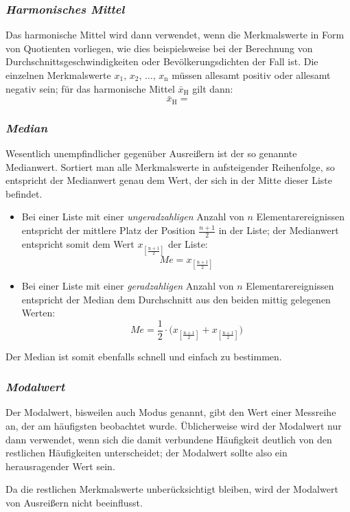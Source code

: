 \documentclass[a4paper]{article}
\providecommand*{\DUrubric}[2][class-arg]{%
  \subsubsection*{\centering\textit{\textmd{#2}}}}
\begin{document}
\DUrubric{Harmonisches Mittel}

Das harmonische Mittel wird dann verwendet, wenn die Merkmalswerte in Form von
Quotienten vorliegen, wie dies beispielsweise bei der Berechnung von
Durchschnittsgeschwindigkeiten oder Bevölkerungsdichten der Fall ist. Die
einzelnen Merkmalswerte $x_1,\,x_2,\,\ldots,\,x_{\mathrm{n}}$  müssen
allesamt positiv oder allesamt negativ sein; für das harmonische Mittel
$\bar{x}_{\mathrm{H}}$ gilt dann:
%
\begin{equation*}
\bar{x}_{\mathrm{H}} =
\end{equation*}
\DUrubric{Median}

Wesentlich unempfindlicher gegenüber Ausreißern ist der so genannte Medianwert.
Sortiert man alle Merkmalswerte in aufsteigender Reihenfolge, so entspricht der
Medianwert genau dem Wert, der sich in der Mitte dieser Liste befindet.
%
\begin{itemize}

\item Bei einer Liste mit einer \emph{ungeradzahligen} Anzahl von $n$
Elementarereignissen entspricht der mittlere Platz der Position
$\frac{n+1}{2}$ in der Liste; der Medianwert entspricht somit dem Wert
$x_{\mathrm{\left[\frac{n+1}{2}\right]}}^{\phantom{X}}$ der Liste:
%
\begin{equation*}
Me = x_{\mathrm{\left[\frac{n+1}{2}\right]}}
\end{equation*}
\item Bei einer Liste mit einer \emph{geradzahligen} Anzahl von $n$
Elementarereignissen entspricht der Median dem Durchschnitt aus den beiden
mittig gelegenen Werten:
%
\begin{equation*}
Me = \frac{1}{2} \cdot \big( x_{\mathrm{\left[\frac{n+1}{2}\right]}} +
x_{\mathrm{\left[\frac{n+1}{2}\right]}}  \big)
\end{equation*}
\end{itemize}

Der Median ist somit ebenfalls schnell und einfach zu bestimmen.

\DUrubric{Modalwert}

Der Modalwert, bisweilen auch \textquotedbl{}Modus\textquotedbl{} genannt, gibt den Wert einer Messreihe an,
der am häufigsten beobachtet wurde. Üblicherweise wird der Modalwert nur dann
verwendet, wenn sich die damit verbundene Häufigkeit deutlich von den restlichen
Häufigkeiten unterscheidet; der Modalwert sollte also ein herausragender Wert
sein.

Da die restlichen Merkmalswerte unberücksichtigt bleiben, wird der Modalwert von
Ausreißern nicht beeinflusst.
\end{document}
